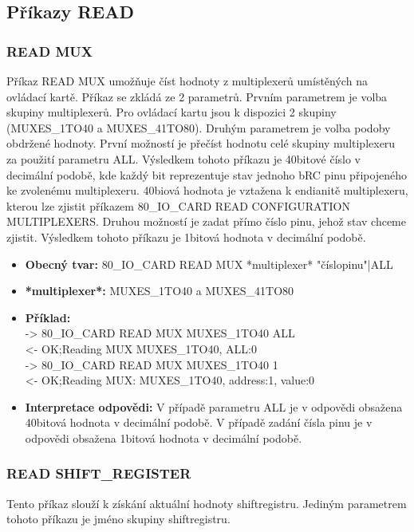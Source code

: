 \subsection{Příkazy READ}
\subsubsection{READ MUX}
Příkaz READ MUX umožňuje číst hodnoty z multiplexerů umístěných na ovládací kartě. Příkaz se zkládá ze 2 parametrů. Prvním parametrem je volba
skupiny multiplexerů. Pro ovládací kartu jsou k dispozici 2 skupiny (MUXES\_1TO40 a MUXES\_41TO80). Druhým parametrem je volba podoby obdržené hodnoty.
První možností je přečíst hodnotu celé skupiny multiplexeru za použití parametru ALL. Výsledkem tohoto příkazu je 40bitové číslo v decimální podobě,
kde každý bit reprezentuje stav jednoho bRC pinu připojeného ke zvolenému multiplexeru. 40biová hodnota je vztažena k endianitě multiplexeru, kterou lze zjistit
příkazem 80\_IO\_CARD READ CONFIGURATION MULTIPLEXERS.
Druhou možností je zadat přímo číslo pinu, jehož stav chceme zjistit. Výsledkem tohoto příkazu je 1bitová hodnota v decimální podobě.
\begin{itemize}[leftmargin=*]
    \item \textbf{Obecný tvar:} 80\_IO\_CARD READ MUX *multiplexer* "číslopinu"|ALL
    \item \textbf{*multiplexer*:} MUXES\_1TO40 a MUXES\_41TO80
    \item \textbf{Příklad:}\\
    -> 80\_IO\_CARD READ MUX MUXES\_1TO40 ALL\\
    <- OK;Reading MUX MUXES\_1TO40, ALL:0\\
    -> 80\_IO\_CARD READ MUX MUXES\_1TO40 1\\
    <- OK;Reading MUX: MUXES\_1TO40, address:1, value:0
    \item \textbf{Interpretace odpovědi:} V případě parametru ALL je v odpovědi obsažena 40bitová hodnota v decimální podobě. V případě zadání čísla pinu je v odpovědi obsažena 1bitová hodnota v decimální podobě.
\end{itemize}

\subsubsection{READ SHIFT\_REGISTER}
Tento příkaz slouží k získání aktuální hodnoty shiftregistru. Jediným parametrem tohoto příkazu je jméno skupiny shiftregistru.


